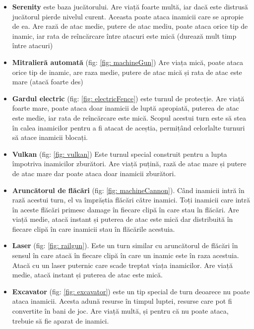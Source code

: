 \documentclass[12pt, a4paper]{article}
\begin{document}
	\begin{itemize}
		\item \textbf{Serenity} este baza jucătorului. Are viață foarte multă, iar dacă este distrusă jucătorul pierde nivelul curent. Aceasta poate ataca inamicii care se apropie de ea. Are rază de atac medie, putere de atac mediu, poate ataca orice tip de inamic, iar rata de reîncărcare între atacuri este mică (durează mult timp între atacuri)
		\item \textbf{Mitralieră automată} (fig: \ref{fig: machineGun}) Are viața mică, poate ataca orice tip de inamic, are raza medie, putere de atac mică și rata de atac este mare (atacă foarte des)
		\item \textbf{Gardul electric} (fig: \ref{fig: electricFence}) este turnul de protecție. Are viață foarte mare, poate ataca doar inamicii de luptă apropiată, puterea de atac este medie, iar rata de reîncărcare este mică. Scopul acestui turn este să stea în calea inamicilor pentru a fi atacat de aceștia, permițând celorlalte turnuri să atace inamicii blocați.
		\item \textbf{Vulkan} (fig: \ref{fig: vulkan}) Este turnul special construit pentru a lupta împotriva inamicilor zburători. Are viață puțină, rază de atac mare și putere de atac mare dar poate ataca doar inamicii zburători.
		\item \textbf{Aruncătorul de flăcări} (fig: \ref{fig: machineCannon}). Când inamicii intră în rază acestui turn, el va împrăștia flăcări către inamici. Toți inamicii care intră în aceste flăcări primesc damage în fiecare clipă în care stau în flăcări. Are viață medie, atacă instant și puterea de atac este mică dar distribuită în fiecare clipă în care inamicii stau în flăcările acestuia.
		\item \textbf{Laser} (fig: \ref{fig: railgun}). Este un turn similar cu aruncătorul de flăcări în sensul în care atacă în fiecare clipă în care un inamic este în raza acestuia. Atacă cu un laser puternic care scade treptat viața inamicilor. Are viață medie, atacă instant și puterea de atac este mică.
		\item \textbf{Excavator} (fig: \ref{fig: excavator}) este un tip special de turn deoarece nu poate ataca inamicii. Acesta adună resurse în timpul luptei, resurse care pot fi convertite în bani de joc. Are viață multă, și pentru că nu poate ataca, trebuie să fie aparat de inamici.
	\end{itemize}
	
\end{document}
